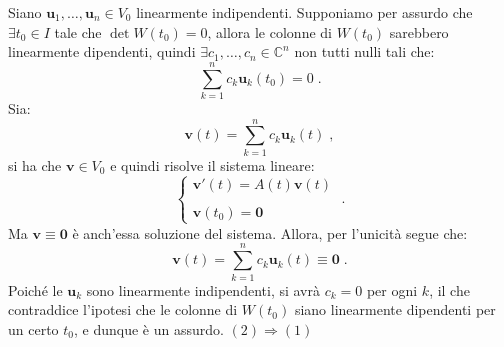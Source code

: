 \documentclass[a4paper,12pt]{report}
\theoremstyle{plain}
\theoremstyle{definition}
\theoremstyle{remark}
\numberwithin{equation}{section}
\begin{document}
Siano $\mathbf{u}_1,\ldots,\mathbf{u}_n \in V_0$ linearmente indipendenti. Supponiamo per assurdo che $\exists t_0 \in I$ tale che
$\det W(t_0)=0$, allora le colonne di $W(t_0)$ sarebbero linearmente dipendenti, quindi $\exists c_1,\ldots,c_n \in \mathbb{C}^n$ non 
tutti nulli tali che:
\begin{equation}
\sum_{k=1}^n c_k \mathbf{u}_k(t_0)=0\;.
\end{equation}
Sia:
\begin{equation}
\mathbf{v}(t)=\sum_{k=1}^n c_k \mathbf{u}_k(t)\;,
\end{equation}
si ha che $\mathbf{v} \in V_0$ e quindi risolve il sistema lineare:
\begin{equation}
\begin{cases}
 \mathbf{v}'(t)=A(t)\mathbf{v}(t) \\
 \\
 \mathbf{v}(t_0)=\mathbf{0}
\end{cases}\;.
\end{equation}
Ma $\mathbf{v} \equiv \mathbf{0}$ è anch'essa soluzione del sistema. Allora, per l'unicità segue che:
\begin{equation}
\mathbf{v}(t)=\sum_{k=1}^n c_k \mathbf{u}_k(t) \equiv \mathbf{0}\;.
\end{equation}
Poiché le $\mathbf{u}_k$ sono linearmente indipendenti, si avrà $c_k=0$ per ogni $ k$, il che contraddice l'ipotesi che le colonne di 
$W(t_0)$ siano linearmente dipendenti per un certo $t_0$, e dunque è un assurdo.
\endproof
\proof $(2) \Longrightarrow (1)$ \\
\end{document}
